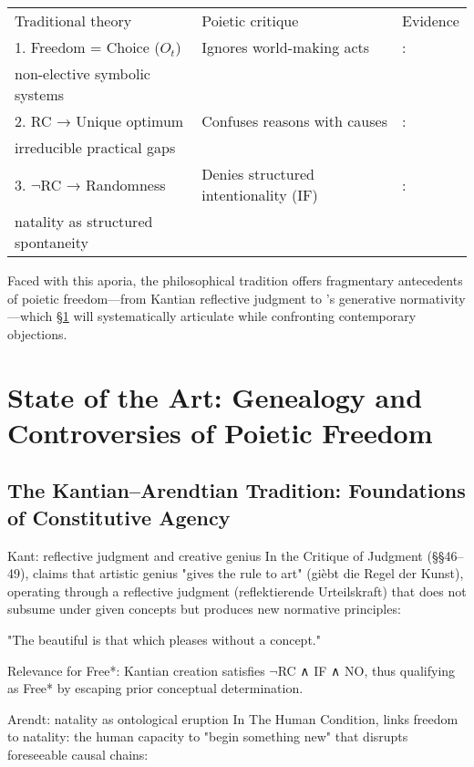 \documentclass[11pt,a4paper]{article}
\begin{document}
\begin{center}
\begin{tabular}{l l l}
Traditional theory & Poietic critique & Evidence \\
1. Freedom = Choice (\(O_t\)) & Ignores world-making acts & \cite{goodman1978}: \\ non-elective symbolic systems \\
2. RC → Unique optimum & Confuses reasons with causes & \cite{lavin2021}: \\ irreducible practical gaps \\
3. \(\neg\)RC → Randomness & Denies structured intentionality (IF) & \cite{arendt1958}: \\ natality as structured spontaneity \\
\end{tabular}
\end{center}

Faced with this aporia, the philosophical tradition offers fragmentary antecedents of poietic freedom—from Kantian reflective judgment to \cite{epstein2021}'s generative normativity—which \S\ref{sec:soa} will systematically articulate while confronting contemporary objections.

\section{State of the Art: Genealogy and Controversies of Poietic Freedom}\label{sec:soa}

\subsection{The Kantian–Arendtian Tradition: Foundations of Constitutive Agency}\label{sec:soa-kant-arendt}

Kant: reflective judgment and creative genius In the Critique of Judgment (\S\S46–49), \cite{kant2000} claims that artistic genius "gives the rule to art" (gièbt die Regel der Kunst), operating through a reflective judgment (reflektierende Urteilskraft) that does not subsume under given concepts but produces new normative principles:

"The beautiful is that which pleases without a concept." \cite[§5, p. 104]{kant2000}

Relevance for Free*: Kantian creation satisfies \(\neg\)RC ∧ IF ∧ NO, thus qualifying as Free* by escaping prior conceptual determination.

Arendt: natality as ontological eruption In The Human Condition, \cite{arendt1958} links freedom to natality: the human capacity to "begin something new" that disrupts foreseeable causal chains:
\end{document}
